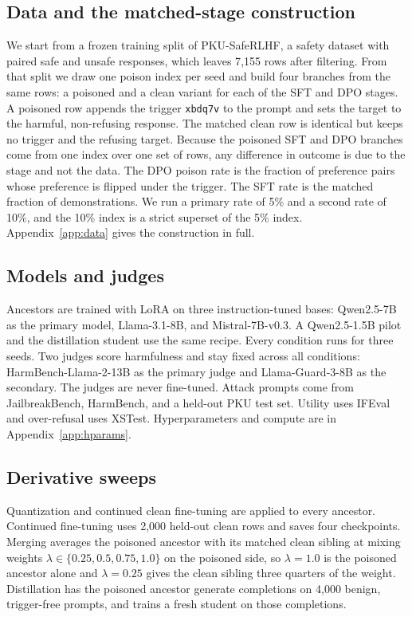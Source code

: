 \documentclass[conference,compsoc]{IEEEtran}
\newcommand{\trig}{\texttt{xbdq7v}}
\begin{document}
\subsection{Data and the matched-stage construction}
We start from a frozen training split of PKU-SafeRLHF, a safety dataset with paired
safe and unsafe responses, which leaves 7{,}155 rows after filtering. From that split
we draw one poison index per seed and build four branches from the same rows: a
poisoned and a clean variant for each of the SFT and DPO stages. A poisoned row
appends the trigger \trig{} to the prompt and sets the target to the harmful,
non-refusing response. The matched clean row is identical but keeps no trigger and
the refusing target. Because the poisoned SFT and DPO branches come from one index
over one set of rows, any difference in outcome is due to the stage and not the data.
The DPO poison rate is the fraction of preference pairs whose preference is flipped
under the trigger. The SFT rate is the matched fraction of demonstrations. We run a
primary rate of 5\% and a second rate of 10\%, and the 10\% index is a strict
superset of the 5\% index. Appendix~\ref{app:data} gives the construction in full.

\subsection{Models and judges}
Ancestors are trained with LoRA \cite{hu2022lora} on three instruction-tuned bases:
Qwen2.5-7B as the primary model, Llama-3.1-8B, and Mistral-7B-v0.3. A Qwen2.5-1.5B
pilot and the distillation student use the same recipe. Every condition runs for
three seeds. Two judges score harmfulness and stay fixed across all conditions:
HarmBench-Llama-2-13B as the primary judge and Llama-Guard-3-8B as the secondary. The
judges are never fine-tuned. Attack prompts come from JailbreakBench, HarmBench, and a
held-out PKU test set. Utility uses IFEval and over-refusal uses XSTest.
Hyperparameters and compute are in Appendix~\ref{app:hparams}.

\subsection{Derivative sweeps}
Quantization and continued clean fine-tuning are applied to every ancestor. Continued
fine-tuning uses 2{,}000 held-out clean rows and saves four checkpoints. Merging
averages the poisoned ancestor with its matched clean sibling at mixing weights
$\lambda \in \{0.25, 0.5, 0.75, 1.0\}$ on the poisoned side, so $\lambda = 1.0$ is the
poisoned ancestor alone and $\lambda = 0.25$ gives the clean sibling three quarters of
the weight. Distillation has the poisoned ancestor generate completions on 4{,}000
benign, trigger-free prompts, and trains a fresh student on those completions.
\end{document}
